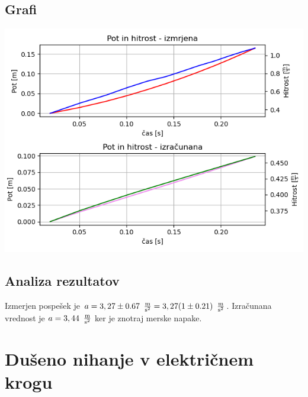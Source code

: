 \documentclass[12pt]{article}
\begin{document}
	\subsection*{Grafi}
	\includegraphics[width=\linewidth]{slike/graf_v5_1.png}

	\subsection*{Analiza rezultatov}
	Izmerjen pospešek je $a = 3,27 \pm 0.67 \enskip \frac{\text{m}}{\text{s}^2} = 3,27 (1 \pm 0.21)\enskip \frac{\text{m}}{\text{s}^2}$.
	Izračunana vrednost je $ a = 3,44 \enskip \frac{\text{m}}{\text{s}^2}$ ker je znotraj 
	merske napake.

\newpage
\section{Dušeno nihanje v električnem krogu}
\end{document}
